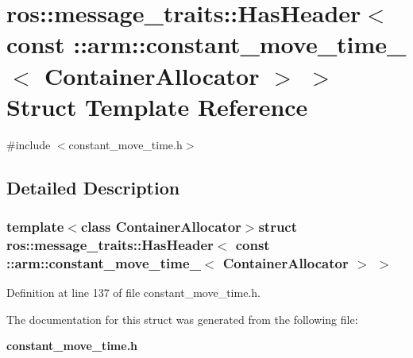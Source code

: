 \section{ros\-:\-:message\-\_\-traits\-:\-:\-Has\-Header$<$ const \-:\-:arm\-:\-:constant\-\_\-move\-\_\-time\-\_\-$<$ \-Container\-Allocator $>$ $>$ \-Struct \-Template \-Reference}
\label{structros_1_1message__traits_1_1HasHeader_3_01const_01_1_1arm_1_1constant__move__time___3_01ContainerAllocator_01_4_01_4}


{\ttfamily \#include $<$constant\-\_\-move\-\_\-time.\-h$>$}



\subsection{\-Detailed \-Description}
\subsubsection*{template$<$class Container\-Allocator$>$struct ros\-::message\-\_\-traits\-::\-Has\-Header$<$ const \-::arm\-::constant\-\_\-move\-\_\-time\-\_\-$<$ Container\-Allocator $>$ $>$}



\-Definition at line 137 of file constant\-\_\-move\-\_\-time.\-h.



\-The documentation for this struct was generated from the following file\-:\begin{DoxyCompactItemize}
\item 
{\bf constant\-\_\-move\-\_\-time.\-h}\end{DoxyCompactItemize}

